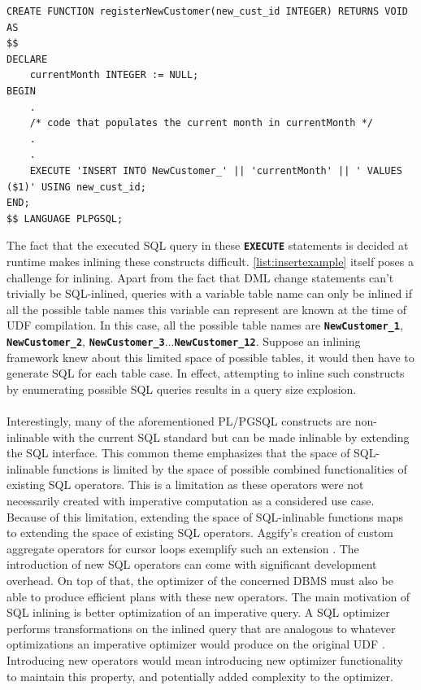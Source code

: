 \documentclass[12pt]{cmuthesis}
\newcommand{\dbSQL}[1]{\texttt{\textbf{#1}}\xspace}
\begin{document}
\begin{listing}
    \begin{verbatim}
CREATE FUNCTION registerNewCustomer(new_cust_id INTEGER) RETURNS VOID AS 
$$
DECLARE
    currentMonth INTEGER := NULL;
BEGIN
    .
    /* code that populates the current month in currentMonth */
    .
    .
    EXECUTE 'INSERT INTO NewCustomer_' || 'currentMonth' || ' VALUES ($1)' USING new_cust_id;
END;
$$ LANGUAGE PLPGSQL;
    \end{verbatim}
    \caption{Example of dynamic SQL \dbSQL{EXECUTE} usage. This function inserts the id of a new customer into a specific table. This table depends on what month it currently is. Note that the '||' is a string concatenation operator in PL/PGSQL.}
    \label{list:dyninsertexample}
    \end{listing}
    
    The fact that the executed SQL query in these \dbSQL{EXECUTE} statements is decided at runtime makes inlining these constructs difficult. \cref{list:insertexample} itself poses a challenge for inlining. Apart from the fact that DML change statements can’t trivially be SQL-inlined, queries with a variable table name can only be inlined if all the possible table names this variable can represent are known at the time of UDF compilation. In this case, all the possible table names are \dbSQL{NewCustomer\_1}, \dbSQL{NewCustomer\_2}, \dbSQL{NewCustomer\_3}...\dbSQL{NewCustomer\_12}. Suppose an inlining framework knew about this limited space of possible tables, it would then have to generate SQL for each table case. In effect, attempting to inline such constructs by enumerating possible SQL queries results in a query size explosion.\\\\


Interestingly, many of the aforementioned PL/PGSQL constructs are non-inlinable with the current SQL standard but can be made inlinable by extending the SQL interface. This common theme emphasizes that the space of SQL-inlinable functions is limited by the space of possible combined functionalities of existing SQL operators. This is a limitation as these operators were not necessarily created with imperative computation as a considered use case. Because of this limitation, extending the space of SQL-inlinable functions maps to extending the space of existing SQL operators. Aggify's creation of custom aggregate operators for cursor loops exemplify such an extension \cite{gupta20}. The introduction of new SQL operators can come with significant development overhead. On top of that, the optimizer of the concerned DBMS must also be able to produce efficient plans with these new operators. The main motivation of SQL inlining is better optimization of an imperative query. A SQL optimizer performs transformations on the inlined query that are analogous to whatever optimizations an imperative optimizer would produce on the original UDF \cite{ramachandra19}. Introducing new operators would mean introducing new optimizer functionality to maintain this property, and potentially added complexity to the optimizer.\\
\end{document}
